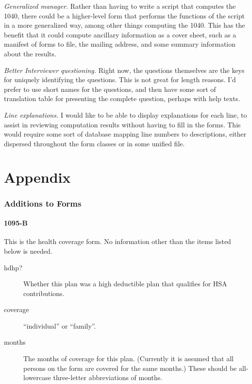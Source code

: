 \documentclass[12pt]{article}
\begin{document}
\emph{Generalized manager.} Rather than having to write a script that computes
the 1040, there could be a higher-level form that performs the functions of the
script in a more generalized way, among other things computing the 1040. This
has the benefit that it could compute ancillary information as a cover sheet,
such as a manifest of forms to file, the mailing address, and some summary
information about the results.

\emph{Better Interviewer questioning.} Right now, the questions themselves are
the keys for uniquely identifying the questions. This is not great for length
reasons. I'd prefer to use short names for the questions, and then have some
sort of translation table for presenting the complete question, perhaps with
help texts.

\emph{Line explanations.} I would like to be able to display explanations for
each line, to assist in reviewing computation results without having to fill in
the forms. This would require some sort of database mapping line numbers to
descriptions, either dispersed throughout the form classes or in some unified
file.




\appendix

\part*{Appendix}


\section{Additions to Forms}

\subsection{1095-B}

This is the health coverage form. No information other than the items listed
below is needed.

\begin{description}
\item[hdhp?] Whether this plan was a high deductible plan that qualifies for HSA
contributions.
\item[coverage] ``individual'' or ``family''.
\item[months] The months of coverage for this plan. (Currently it is assumed
that all persons on the form are covered for the same months.) These should be
all-lowercase three-letter abbreviations of months.
\end{description}
\end{document}
